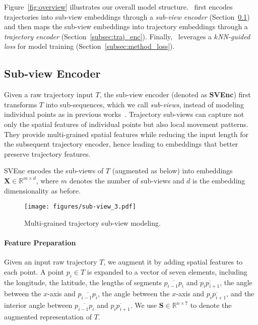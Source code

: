 
Figure~\ref{fig:overview} illustrates our overall model structure.
\model\ first encodes trajectories into sub-view embeddings through a \emph{sub-view encoder} (Section~\ref{subsec:method_patch}) and then  maps the sub-view embeddings into trajectory embeddings through a \emph{trajectory encoder} (Section~\ref{subsec:traj_enc}).
Finally, \model\ leverages a \emph{$k$NN-guided loss} for model training (Section~\ref{subsec:method_loss}).


\subsection{Sub-view Encoder}\label{subsec:method_patch}


Given a raw trajectory input $T$, the sub-view encoder (denoted as \textbf{SVEnc}) first transforms $T$ into sub-sequences,
which we call \emph{sub-views}, instead of modeling individual points as in previous works~\cite{neutraj,t3s,trajcl}.
Trajectory sub-views can capture not only the spatial features of individual points but also local movement patterns. They provide multi-grained spatial features while reducing the input length for the subsequent trajectory encoder, hence leading to embeddings that better preserve trajectory features.

SVEnc encodes the sub-views of $T$ (augmented as below) into embeddings $\mathbf{X} \in \mathbb{R}^{m\times d}$, where $m$ denotes the number of sub-views and $d$ is the embedding dimensionality as before. 








\begin{figure}[th]
    \centering
    \texttt{[image: figures/sub-view\_3.pdf]}
    \vspace{-2mm}
    \caption{Multi-grained trajectory sub-view modeling.}\label{fig:subview}
    \vspace{-3mm}
\end{figure}



\paragraph{Feature Preparation} 
Given an input raw trajectory $T$, we augment it by adding spatial features to each point. 
A point $p_i \in T$ is expanded to a vector of  seven elements, including the longitude, the latitude, the lengths of segments $\overline{p_{i-1} p_i}$ and $\overline{p_i p_{i+1}}$, the angle between the $x$-axis and $\overline{p_{i-1} p_i}$, the angle between the $x$-axis and $\overline{p_i p_{i+1}}$, and the interior angle between $\overline{p_{i-1} p_i}$ and $\overline{p_i p_{i+1}}$.
We use $\mathbf{S} \in \mathbb{R}^{n\times 7}$ to denote the augmented representation of $T$.

